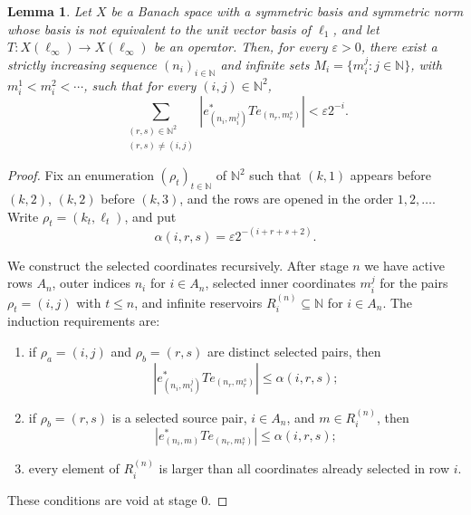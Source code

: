 \documentclass[11pt]{amsart}
\theoremstyle{plain}
\newtheorem{lemma}[theorem]{Lemma}
\theoremstyle{definition}
\numberwithin{equation}{section}
\newcommand{\N}{\mathbb{N}}
\renewcommand{\leq}{\leqslant}
\begin{document}
\begin{lemma}\label{lmm: l_inf_cross-interaction}
    Let $X$ be a Banach space with a symmetric basis and symmetric norm whose basis is not equivalent to the unit vector basis of $\ell_1$, and let $T \colon X(\ell_\infty) \to X(\ell_\infty)$ be an operator. Then, for every $\varepsilon > 0$, there exist a strictly increasing sequence $(n_i)_{i \in \N}$ and infinite sets $M_i=\{m_i^j:j\in\N\}$, with $m_i^1<m_i^2<\cdots$, such that for every $(i,j)\in\N^2$,
    \begin{equation*}
        \sum_{\substack{(r,s) \in \N^2 \\ (r,s) \ne (i,j)}} |e_{(n_i, m_i^j)}^* T e_{(n_r, m_r^s)}| < \varepsilon 2^{-i}.
    \end{equation*}
\end{lemma}
\begin{proof}
    Fix an enumeration $(\rho_t)_{t\in\N}$ of $\N^2$ such that $(k,1)$ appears before $(k,2)$, $(k,2)$ before $(k,3)$, and the rows are opened in the order $1,2,\dots$. Write $\rho_t=(k_t,\ell_t)$, and put
    \begin{equation*}
        \alpha(i,r,s)=\varepsilon 2^{-(i+r+s+2)}.
    \end{equation*}

    We construct the selected coordinates recursively. After stage $n$ we have active rows $A_n$, outer indices $n_i$ for $i\in A_n$, selected inner coordinates $m_i^j$ for the pairs $\rho_t=(i,j)$ with $t\leq n$, and infinite reservoirs $R_i^{(n)}\subseteq\N$ for $i\in A_n$. The induction requirements are:
    \begin{enumerate}[label=(\roman*), ref=(\roman*)]
        \item \label{it: linfty-cross-selected} if $\rho_a=(i,j)$ and $\rho_b=(r,s)$ are distinct selected pairs, then
        \begin{equation*}
            |e^*_{(n_i,m_i^j)}Te_{(n_r,m_r^s)}|\leq \alpha(i,r,s);
        \end{equation*}
        \item \label{it: linfty-cross-reservoir} if $\rho_b=(r,s)$ is a selected source pair, $i\in A_n$, and $m\in R_i^{(n)}$, then
        \begin{equation*}
            |e^*_{(n_i,m)}Te_{(n_r,m_r^s)}|\leq \alpha(i,r,s);
        \end{equation*}
        \item every element of $R_i^{(n)}$ is larger than all coordinates already selected in row $i$.
    \end{enumerate}
    These conditions are void at stage $0$.


\end{proof}
\end{document}
